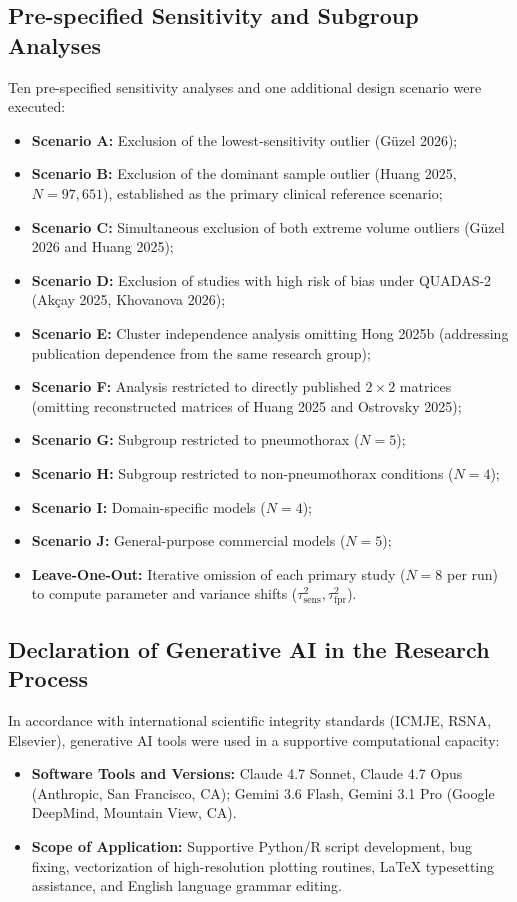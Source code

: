 \documentclass[preprint,11pt]{elsarticle}
\begin{document}
\subsection{Pre-specified Sensitivity and Subgroup Analyses}
Ten pre-specified sensitivity analyses and one additional design scenario were executed:
\begin{itemize}
    \item \textbf{Scenario A:} Exclusion of the lowest-sensitivity outlier (Güzel 2026);
    \item \textbf{Scenario B:} Exclusion of the dominant sample outlier (Huang 2025, $N=97,651$), established as the primary clinical reference scenario;
    \item \textbf{Scenario C:} Simultaneous exclusion of both extreme volume outliers (Güzel 2026 and Huang 2025);
    \item \textbf{Scenario D:} Exclusion of studies with high risk of bias under QUADAS-2 (Akçay 2025, Khovanova 2026);
    \item \textbf{Scenario E:} Cluster independence analysis omitting Hong 2025b (addressing publication dependence from the same research group);
    \item \textbf{Scenario F:} Analysis restricted to directly published $2\times 2$ matrices (omitting reconstructed matrices of Huang 2025 and Ostrovsky 2025);
    \item \textbf{Scenario G:} Subgroup restricted to pneumothorax ($N=5$);
    \item \textbf{Scenario H:} Subgroup restricted to non-pneumothorax conditions ($N=4$);
    \item \textbf{Scenario I:} Domain-specific models ($N=4$);
    \item \textbf{Scenario J:} General-purpose commercial models ($N=5$);
    \item \textbf{Leave-One-Out:} Iterative omission of each primary study ($N=8$ per run) to compute parameter and variance shifts ($\tau^2_{\text{sens}}, \tau^2_{\text{fpr}}$).
\end{itemize}

\subsection{Declaration of Generative AI in the Research Process}
In accordance with international scientific integrity standards (ICMJE, RSNA, Elsevier), generative AI tools were used in a supportive computational capacity:
\begin{itemize}
    \item \textbf{Software Tools and Versions:} Claude 4.7 Sonnet, Claude 4.7 Opus (Anthropic, San Francisco, CA); Gemini 3.6 Flash, Gemini 3.1 Pro (Google DeepMind, Mountain View, CA).
    \item \textbf{Scope of Application:} Supportive Python/R script development, bug fixing, vectorization of high-resolution plotting routines, LaTeX typesetting assistance, and English language grammar editing.
\end{itemize}
\end{document}
